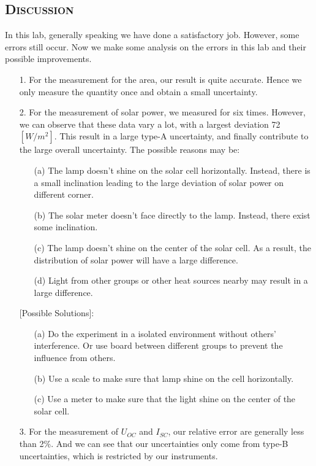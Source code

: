 \documentclass[a4paper,12pt]{article}
\begin{document}
\subsection{\textsc{Discussion}}
In this lab, generally speaking we have done a satisfactory job. However, some errors still occur. Now we make some analysis on the errors in this lab and their possible improvements.
\begin{itemize}
\item[1.] For the measurement for the area, our result is quite accurate. Hence we only measure the quantity once and obtain a small uncertainty.
\item[2.] For the measurement of solar power, we measured for six times. However, we can observe that these data vary a lot, with a largest deviation 72$[W/m^2]$. This result in a large type-A uncertainty, and finally contribute to the large overall uncertainty. The possible reasons may be:
		\begin{itemize}
		\item[(a)] The lamp doesn't shine on the solar cell horizontally. Instead, there is a small inclination leading to the large deviation of solar power on different corner.
		\item[(b)] The solar meter doesn't face directly to the lamp. Instead, there exist some inclination.
		\item[(c)] The lamp doesn't shine on the center of the solar cell. As a result, the distribution of solar power will have a large difference.
		\item[(d)] Light from other groups or other heat sources nearby may result in a large difference. 
		\end{itemize}

		[Possible Solutions]:
		\begin{itemize}
		\item[(a)] Do the experiment in a isolated environment without others' interference. Or use board between different groups to prevent the influence from others.
		\item[(b)] Use a scale to make sure that lamp shine on the cell horizontally.
		\item[(c)] Use a meter to make sure that the light shine on the center of the solar cell.
		\end{itemize}

\item[3.] For the measurement of $U_{OC}$ and $I_{SC}$, our relative error are generally less than 2\%. And we can see that our uncertainties only come from type-B uncertainties, which is restricted by our instruments.


\end{itemize}
\end{document}
